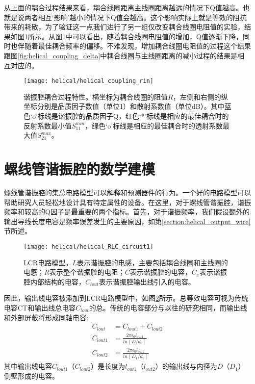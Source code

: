 从上面的耦合过程结果来看，耦合线圈距离主线圈距离越远的情况下Q值越高。也就是说两者相互‘影响’越小的情况下Q值会越高。这个影响实际上就是等效的阻抗带来的耗散，为了验证这一点我们进行了另一组仅改变耦合线圈电阻值的实验，结果如图\ref{fig:helical_coupling_rin}所示。从图\ref{fig:helical_coupling_rin}中可以看出，随着耦合线圈电阻值的增加，Q值逐渐下降，同时也伴随着最佳耦合频率的偏移。不难发现，增加耦合线圈电阻值的过程这个结果跟图\ref{fig:helical_coupling_delta}中耦合线圈与主线圈距离的减小过程的结果是相互对应的。
\begin{figure}
    \centering
    \caption[谐振腔耦合过程特性]{谐振腔耦合过程特性。横坐标为耦合线圈的阻值$R$，左侧和右侧的纵坐标分别是品质因子数值（单位1）和散射系数值（单位dB）。其中蓝色‘o’标线是谐振腔的品质因子Q，红色‘*’标线是相应的最佳耦合时的反射系数最小值$S_{11}^{min}$，绿色‘o’标线是相应的最佳耦合时的透射系数最大值$S_{21}^{max}$。\label{fig:helical_coupling_rin}}
    \texttt{[image: helical/helical\_coupling\_rin]}
\end{figure}



\newpage
\section[螺线管谐振腔的数学建模]{螺线管谐振腔的数学建模\label{section:helical_theory_model}}

螺线管谐振腔的集总电路模型可以解释和预测器件的行为。一个好的电路模型可以帮助研究人员轻松地设计具有特定属性的设备。在这里，对于螺线管谐振腔，谐振频率和较高的Q因子是最重要的两个指标。首先，对于谐振频率，我们假设额外的输出导线长度电容是频率误差发生的主要原因，如第\ref{section:helical_output_wire}节所述。

\begin{figure}
    \centering
    \caption[LCR电路模型]{LCR电路模型。$L$表示谐振腔的电感，主要包括耦合线圈和主线圈的电感；$R$表示整个谐振腔的电阻；$C$表示谐振腔的电容，$C_x$表示谐振腔内部结构的电容，$C_{lout}$表示谐振腔输出线引入的电容。\label{fig:helical_RLC_circuit1}}
    \texttt{[image: helical/helical\_RLC\_circuit1]}
\end{figure}

因此，输出线电容被添加到LCR电路模型中，如图\ref{fig:helical_RLC_circuit1}所示。总等效电容可视为传统电容CT和输出线总电容$C_{lout}$的总。传统的电容部分与以往的研究相同，而输出线和外部屏蔽将形成同轴电容:
\begin{align} 
	C_{lout}&=C_{lout1}+C_{lout2} \label{eq:helical_lout}\\ 
	C_{lout1}&=\frac{2\pi\epsilon_0 l_{out1}}{ln(D/d_0)} \label{eq:helical_lout1}\\ 
	C_{lout2}&=\frac{2\pi\epsilon_0 l_{out2}}{ln(D_1/d_0)} \label{eq:helical_lout2}
\end{align}
其中输出线电容$C_{lout1}$（$C_{lout2}$）是长度为$l_{out1}$（$l_{out2}$）的输出线与内径为$D$（$D_1$）侧壁形成的电容。

